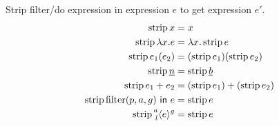 

 Strip filter/do expression in expression \(e\) to get expression \(e'\).
\[
  \begin{aligned}
    \Strip{x} &= x \\
    \Strip{\Lam{x}{e}} &= \Lam{x}{\Strip{e}} \\
    \Strip{e_1(e_2)} &= (\Strip{e_1})(\Strip{e_2}) \\
    \Strip{\Nat{n}} &= \Strip{\Nat{b}} \\
    \Strip{e_1 + e_2} &= (\Strip{e_1}) + (\Strip{e_2}) \\
    \Strip{\Filter{(p, a, g)}{e}} &= \Strip{e} \\
    \Strip{\Residue{a}{g}{l}{e}} &= \Strip{e}
  \end{aligned}
\]

